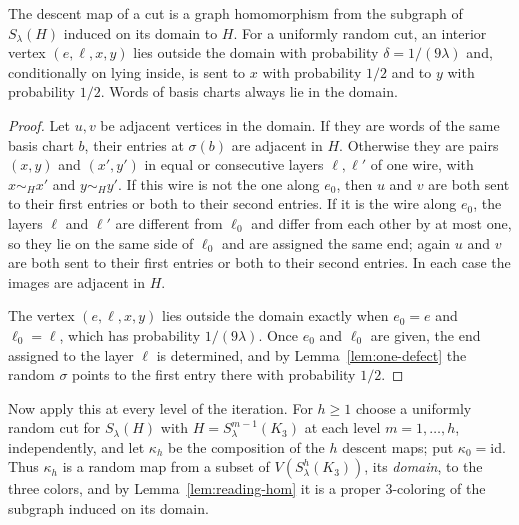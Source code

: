\begin{lemma}\label{lem:reading-hom}
The descent map of a cut is a graph homomorphism from the subgraph of $S_\lambda(H)$ induced on its domain to $H$. For a uniformly random cut, an interior vertex $(e,\ell,x,y)$ lies outside the domain with probability $\delta=1/(9\lambda)$ and, conditionally on lying inside, is sent to $x$ with probability $1/2$ and to $y$ with probability $1/2$. Words of basis charts always lie in the domain.
\end{lemma}
\begin{proof}
Let $u,v$ be adjacent vertices in the domain. If they are words of the same basis chart $b$, their entries at $\sigma(b)$ are adjacent in $H$. Otherwise they are pairs $(x,y)$ and $(x',y')$ in equal or consecutive layers $\ell,\ell'$ of one wire, with $x\sim_Hx'$ and $y\sim_Hy'$. If this wire is not the one along $e_0$, then $u$ and $v$ are both sent to their first entries or both to their second entries. If it is the wire along $e_0$, the layers $\ell$ and $\ell'$ are different from $\ell_0$ and differ from each other by at most one, so they lie on the same side of $\ell_0$ and are assigned the same end; again $u$ and $v$ are both sent to their first entries or both to their second entries. In each case the images are adjacent in $H$.

The vertex $(e,\ell,x,y)$ lies outside the domain exactly when $e_0=e$ and $\ell_0=\ell$, which has probability $1/(9\lambda)$. Once $e_0$ and $\ell_0$ are given, the end assigned to the layer $\ell$ is determined, and by Lemma~\ref{lem:one-defect} the random $\sigma$ points to the first entry there with probability $1/2$.
\end{proof}

Now apply this at every level of the iteration. For $h\ge1$ choose a uniformly random cut for $S_\lambda(H)$ with $H=S^{m-1}_\lambda(K_3)$ at each level $m=1,\ldots,h$, independently, and let $\kappa_h$ be the composition of the $h$ descent maps; put $\kappa_0=\mathrm{id}$. Thus $\kappa_h$ is a random map from a subset of $V(S^h_\lambda(K_3))$, its \emph{domain}, to the three colors, and by Lemma~\ref{lem:reading-hom} it is a proper $3$-coloring of the subgraph induced on its domain.

